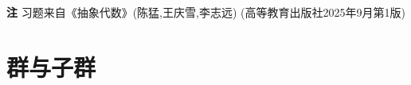 \newenvironment{solution}{\begin{proof}[解答]}{\end{proof}}

\textbf{注} \quad 习题来自《抽象代数》(陈猛,王庆雪,李志远) (高等教育出版社2025年9月第1版)

\section{群与子群}

